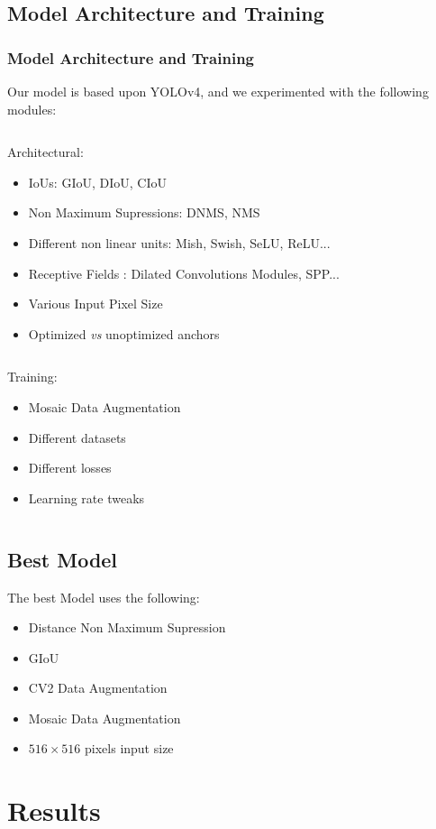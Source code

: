 \documentclass[aspectratio=169]{beamer}
\begin{document}
\subsection{Model Architecture and Training}
\begin{frame}
	\frametitle{Model Architecture and Training}
	Our model is based upon YOLOv4, and we experimented with the following modules:
	\begin{column}{.48\textwidth}
		Architectural:
	\begin{itemize}
		\item IoUs: GIoU, DIoU, CIoU
		\item Non Maximum Supressions: DNMS, NMS
		\item Different non linear units: Mish, Swish, SeLU, ReLU...
		\item Receptive Fields : Dilated Convolutions Modules, SPP...
		\item Various Input Pixel Size
		\item Optimized \textit{vs} unoptimized anchors 
	\end{itemize}
	\end{column}
	\hfill%
	\begin{column}{.48\textwidth}
	Training:
	\begin{itemize}
		\item Mosaic Data Augmentation
		\item Different datasets
		\item Different losses 
		\item Learning rate tweaks 
	\end{itemize}
	\end{column}
\end{frame}

\subsection{Best Model}
\begin{frame}
The best Model uses the following:
\begin{itemize}
	\item Distance Non Maximum Supression
	\item GIoU
	\item CV2 Data Augmentation
	\item Mosaic Data Augmentation
	\item $516 \times 516$ pixels input size
\end{itemize}
\end{frame}
\section{Results}
\end{document}
